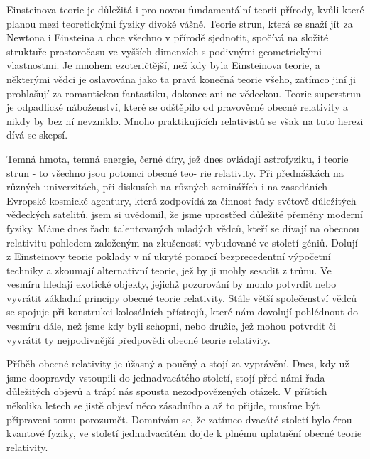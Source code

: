   Einsteinova teorie je důležitá i pro novou fundamentální teorii přírody, kvůli které planou mezi
  teoretickými fyziky divoké vášně. Teorie strun, která se snaží jít za Newtona i Einsteina a chce
  všechno v přírodě sjednotit, spočívá na složité struktuře prostoročasu ve vyšších dimenzích s
  podivnými geometrickými vlastnostmi. Je mnohem ezoteričtější, než kdy byla Einsteinova teorie, a
  některými vědci je oslavována jako ta pravá konečná teorie všeho, zatímco jiní ji prohlašují za
  romantickou fantastiku, dokonce ani ne vědeckou. Teorie superstrun je odpadlické náboženství,
  které se odštěpilo od pravověrné obecné relativity a nikdy by bez ní nevzniklo. Mnoho
  praktikujících relativistů se však na tuto herezi dívá se skepsí. 

  Temná hmota, temná energie, černé díry, jež dnes ovládají astrofyziku, i teorie strun - to všechno
  jsou potomci obecné teo- rie relativity. Při přednáškách na různých univerzitách, při diskusích na
  různých seminářích i na zasedáních Evropské kosmické agentury, která zodpovídá za činnost řady
  světově důležitých vědeckých satelitů, jsem si uvědomil, že jsme uprostřed důležité přeměny
  moderní fyziky. Máme dnes řadu talentovaných mladých vědců, kteří se dívají na obecnou relativitu
  pohledem založeným na zkušenosti vybudované ve století géniů. Dolují z Einsteinovy teorie poklady
  v ní ukryté pomocí bezprecedentní výpočetní techniky a zkoumají alternativní teorie, jež by ji
  mohly sesadit z trůnu. Ve vesmíru hledají exotické objekty, jejichž pozorování by mohlo potvrdit
  nebo vyvrátit základní principy obecné teorie relativity. Stále větší společenství vědců se
  spojuje při konstrukci kolosálních přístrojů, které nám dovolují pohlédnout do vesmíru dále, než
  jsme kdy byli schopni, nebo družic, jež mohou potvrdit či vyvrátit ty nejpodivnější předpovědi
  obecné teorie relativity. 

  Příběh obecné relativity je úžasný a poučný a stojí za vyprávění. Dnes, kdy už jsme doopravdy
  vstoupili do jednadvacátého století, stojí před námi řada důležitých objevů a trápí nás spousta
  nezodpovězených otázek. V příštích několika letech se jistě objeví něco zásadního a až to přijde,
  musíme být připraveni tomu porozumět. Domnívám se, že zatímco dvacáté století bylo érou kvantové
  fyziky, ve století jednadvacátém dojde k plnému uplatnění obecné teorie relativity.

